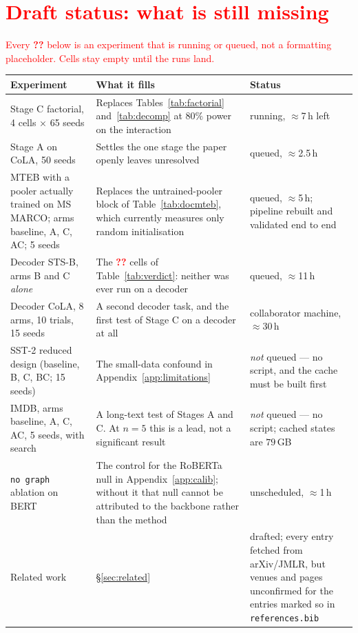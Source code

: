 \documentclass{article}
\newcommand{\PEND}{\textcolor{red}{\textbf{??}}}
\begin{document}
\section*{\textcolor{red}{Draft status: what is still missing}}

\textcolor{red}{Every \PEND{} below is an experiment that is running or queued,
not a formatting placeholder. Cells stay empty until the runs land.}

\begin{center}
\footnotesize
\begin{tabular}{p{}p{}p{}}
\toprule
Experiment & What it fills & Status \\
\midrule
Stage C factorial, 4 cells $\times$ 65 seeds
  & Replaces Tables~\ref{tab:factorial} and~\ref{tab:decomp} at $80\%$ power on
    the interaction
  & running, $\approx$7\,h left \\
Stage A on CoLA, 50 seeds
  & Settles the one stage the paper openly leaves unresolved
  & queued, $\approx$2.5\,h \\
MTEB with a pooler actually trained on MS MARCO; arms baseline, A, C, AC;
  5 seeds
  & Replaces the untrained-pooler block of Table~\ref{tab:docmteb}, which
    currently measures only random initialisation
  & queued, $\approx$5\,h; pipeline rebuilt and validated end to end \\
Decoder STS-B, arms B and C \emph{alone}
  & The \PEND{} cells of Table~\ref{tab:verdict}: neither was ever run on a
    decoder
  & queued, $\approx$11\,h \\
Decoder CoLA, 8 arms, 10 trials, 15 seeds
  & A second decoder task, and the first test of Stage C on a decoder at all
  & collaborator machine, $\approx$30\,h \\
SST-2 reduced design (baseline, B, C, BC; 15 seeds)
  & The small-data confound in Appendix~\ref{app:limitations}
  & \emph{not} queued --- no script, and the cache must be built first \\
IMDB, arms baseline, A, C, AC, 5 seeds, with search
  & A long-text test of Stages A and C. At $n{=}5$ this is a lead, not a
    significant result
  & \emph{not} queued --- no script; cached states are $79$\,GB \\
\texttt{no graph} ablation on BERT
  & The control for the RoBERTa null in Appendix~\ref{app:calib}; without it
    that null cannot be attributed to the backbone rather than the method
  & unscheduled, $\approx$1\,h \\
Related work
  & \S\ref{sec:related}
  & drafted; every entry fetched from arXiv/JMLR, but venues and pages
    unconfirmed for the entries marked so in \texttt{references.bib} \\
\bottomrule
\end{tabular}
\end{center}
\end{document}
